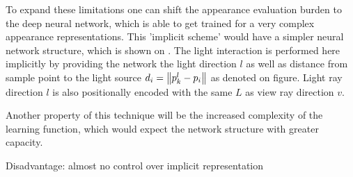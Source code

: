 To expand these limitations one can shift the appearance evaluation burden to the deep neural network,
which is able to get trained for a very complex appearance representations.
This 'implicit scheme' would have a simpler neural network structure,
which is shown on .
The light interaction is performed here implicitly by providing 
the network the light direction $l$ as well as distance from sample point to the light source $d_i = \norm{p^l_k - p_i}$
as denoted on figure.
Light ray direction $l$ is also positionally encoded with the same $L$ as view ray direction $v$.

Another property of this technique will be the increased complexity of the learning function,
which would expect the network structure with greater capacity.

Disadvantage: almost no control over implicit representation








